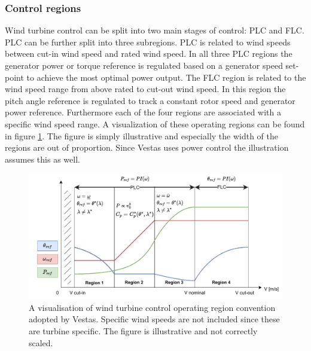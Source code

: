 \subsubsection{Control regions} \label{sec:theory_ctrl_regions}
Wind turbine control can be split into two main stages of control: PLC and FLC. PLC can be further split into three subregions. PLC is related to wind speeds between cut-in wind speed and rated wind speed. In all three PLC regions the generator power or torque reference is regulated based on a generator speed set-point to achieve the most optimal power output. The FLC region is related to the wind speed range from above rated to cut-out wind speed. In this region the pitch angle reference is regulated to track a constant rotor speed and generator power reference. Furthermore each of the four regions are associated with a specific wind speed range. A visualization of these operating regions can be found in figure \cref{fig:operating_regions}. The figure is simply illustrative and especially the width of the regions are out of proportion. Since Vestas uses power control the illustration assumes this as well.
\begin{figure}[ht]
	\centering
	\includegraphics[width=0.9\linewidth]{Graphics/OperatingRegions.pdf}
	\caption{A visualisation of wind turbine control operating region convention adopted by Vestas. Specific wind speeds are not included since these are turbine specific. The figure is illustrative and not correctly scaled.}
	\label{fig:operating_regions}
\end{figure}

